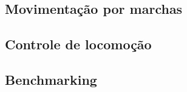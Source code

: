 \documentclass[../main.tex]{subfiles}
\begin{document}
  \subsection{Movimentação por marchas}

  \subsection{Controle de locomoção}

  \subsection{Benchmarking}

  
\end{document}
